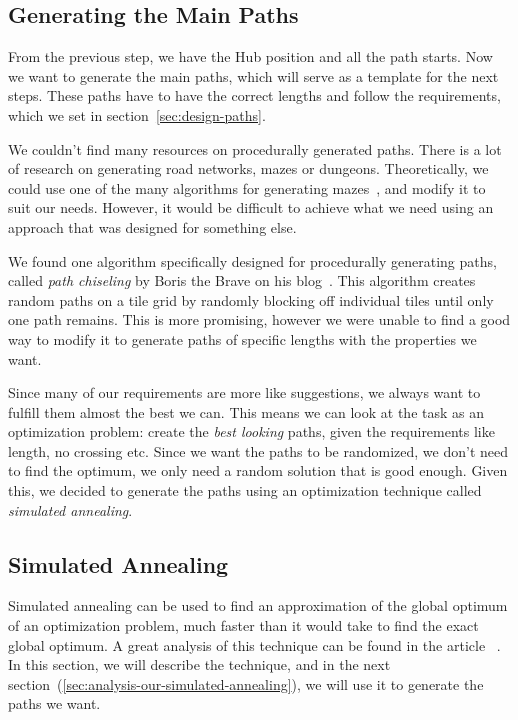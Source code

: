 \subsection{Generating the Main Paths}\label{sec:analysis-main-paths}

From the previous step, we have the Hub position and all the path starts.
Now we want to generate the main paths, which will serve as a template for the next steps.
These paths have to have the correct lengths and follow the requirements, which we set in section~\ref{sec:design-paths}.

We couldn't find many resources on procedurally generated paths.
There is a lot of research on generating road networks, mazes or dungeons.
Theoretically, we could use one of the many algorithms for generating mazes~\cite{MazeWiki}, and modify it to suit our needs.
However, it would be difficult to achieve what we need using an approach that was designed for something else.

We found one algorithm specifically designed for procedurally generating paths, called \emph{path chiseling} by Boris the Brave on his blog~\cite{PathChiseling1,PathChiseling2}.
This algorithm creates random paths on a tile grid by randomly blocking off individual tiles until only one path remains.
This is more promising, however we were unable to find a good way to modify it to generate paths of specific lengths with the properties we want.

Since many of our requirements are more like suggestions, we always want to fulfill them almost the best we can.
This means we can look at the task as an optimization problem: create the \emph{best looking} paths, given the requirements like length, no crossing etc.
Since we want the paths to be randomized, we don't need to find the optimum, we only need a random solution that is good enough.
Given this, we decided to generate the paths using an optimization technique called \emph{simulated annealing}.

\subsection{Simulated Annealing}\label{sec:analysis-simulated-annealing}

Simulated annealing can be used to find an approximation of the global optimum of an optimization problem, much faster than it would take to find the exact global optimum.
A great analysis of this technique can be found in the article ~\cite{SimulatedAnnealing}.
In this section, we will describe the technique, and in the next section~(\ref{sec:analysis-our-simulated-annealing}), we will use it to generate the paths we want.

